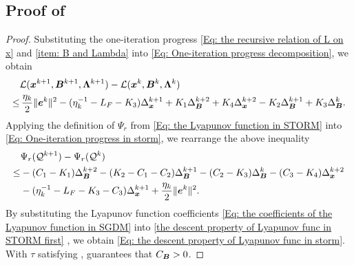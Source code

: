 \subsection{Proof of }
\label{app:storm-descent-proof}
\begin{proof}
    Substituting the one-iteration progress \eqref{Eq: the recursive relation of L on x}
    and \eqref{item: B and Lambda} into \eqref{Eq: One-iteration progress decomposition}, we obtain
    \begin{align}
             & \calL (\bx^{k+1}, \bB^{k+1}, \bLmbd^{k+1}) - \calL (\bx^{k}, \bB^{k}, \bLmbd^{k}) \nonumber                                                                                                                                          \\
        \leq & \,\frac{\eta_{k}}{2}\| \be^{k}\|^{2}- (\eta_{k}^{-1}- L_{F}- K_{3}) \Delta_{\bx}^{k+1}+ K_{1}\Delta_{\bB}^{k+2}+ K_{4}\Delta_{\bx}^{k+2}- K_{2}\Delta_{\bB}^{k+1}+ K_{3}\Delta_{\bB}^{k}.\label{Eq: One-iteration progress in storm}
    \end{align}
    Applying the definition of $\Psi_r$ from \eqref{Eq: the Lyapunov function in STORM} into \eqref{Eq: One-iteration progress in storm}, we rearrange the above inequality
    \begin{align}
        \label{the descent property of Lyapunov func in STORM first} & \Psi_r(\mathcal{Q}^{k+1}) - \Psi_r(\mathcal{Q}^{k}) \notag                                                                                         \\
        \leq                                                         & - (C_{1}- K_{1}) \Delta_{\bm{B}}^{k+2}-(K_{2}- C_{1}- C_{2}) \Delta_{\bm{B}}^{k+1}- (C_{2}- K_{3}) \Delta_{\bm{B}}^{k}- (C_{3}-K_{4}) \Delta_{\bx}^{k+2}\notag \\
                                                                     & -(\eta_{k}^{-1}- L_{F}- K_{3}- C_{3}) \Delta_{\bx}^{k+1}+ \frac{\eta_{k}}{2}\| \be^{k}\|^{2}.
    \end{align}
    By substituting the Lyapunov function coefficients \eqref{Eq: the coefficients of the Lyapunov function in SGDM} into \eqref{the descent property of Lyapunov func in STORM first} , we obtain \eqref{Eq: the descent property of Lyapunov func in storm}. With $\tau$ satisfying ,  guarantees that $C_{\bm{B}}>0$.
\end{proof}


